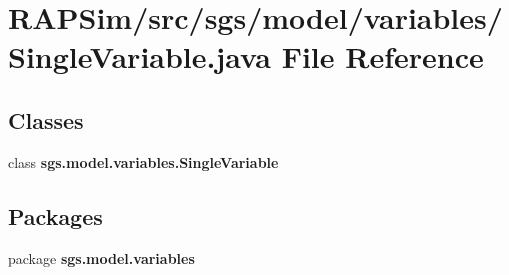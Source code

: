 \section{R\-A\-P\-Sim/src/sgs/model/variables/\-Single\-Variable.java File Reference}
\label{_single_variable_8java}
\subsection*{Classes}
\begin{DoxyCompactItemize}
\item 
class {\bf sgs.\-model.\-variables.\-Single\-Variable}
\end{DoxyCompactItemize}
\subsection*{Packages}
\begin{DoxyCompactItemize}
\item 
package {\bf sgs.\-model.\-variables}
\end{DoxyCompactItemize}
